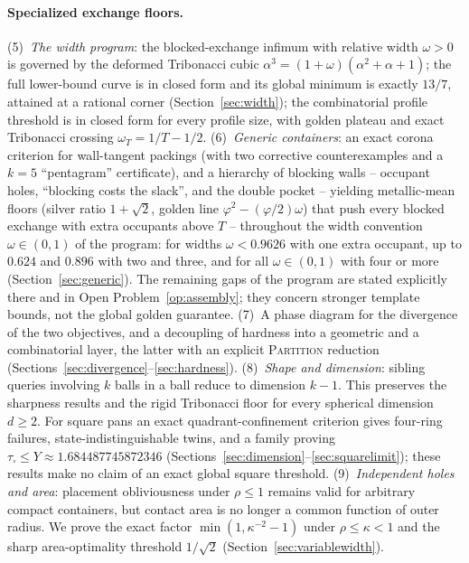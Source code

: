 \documentclass[11pt]{article}
\theoremstyle{definition}
\begin{document}
\paragraph{Specialized exchange floors.}
(5)~\emph{The width program}: the blocked-exchange infimum with relative
width $\omega>0$ is governed by the deformed Tribonacci cubic
$\alpha^3=(1+\omega)(\alpha^2+\alpha+1)$; the full lower-bound curve is in
closed form and its global minimum is exactly $13/7$, attained at a rational
corner (Section~\ref{sec:width}); the combinatorial profile threshold is
in closed form for every profile size, with golden plateau and exact Tribonacci
crossing $\omega_T=1/T-1/2$.
(6)~\emph{Generic containers}: an exact corona criterion for wall-tangent
packings (with two corrective counterexamples and a $k=5$ ``pentagram''
certificate), and a hierarchy of blocking walls -- occupant holes, ``blocking
costs the slack'', and the double pocket -- yielding metallic-mean floors
(silver ratio $1+\sqrt2$, golden line $\varphi^2-(\varphi/2)\omega$) that
push every blocked exchange with extra occupants above $T$ -- throughout
the width convention $\omega\in(0,1)$ of the program: for widths
$\omega<0.9626$ with one extra occupant, up to $0.624$ and $0.896$ with two
and three, and for all $\omega\in(0,1)$ with four or more
(Section~\ref{sec:generic}). The remaining gaps of the program are stated
explicitly there and in Open Problem~\ref{op:assembly}; they concern
stronger template bounds, not the global golden guarantee.
(7)~A phase diagram for the divergence of the two objectives, and a
decoupling of hardness into a geometric and a combinatorial layer, the
latter with an explicit \textsc{Partition} reduction
(Sections~\ref{sec:divergence}--\ref{sec:hardness}).
(8)~\emph{Shape and dimension}: sibling queries involving $k$ balls in
a ball reduce to dimension $k-1$. This preserves the sharpness results
and the rigid Tribonacci floor for every spherical dimension $d\ge2$.
For square pans an exact quadrant-confinement criterion gives four-ring
failures, state-indistinguishable twins, and a family proving
$\tau_{\square}\le Y\approx1.684487745872346$
(Sections~\ref{sec:dimension}--\ref{sec:squarelimit}); these results
make no claim of an exact global square threshold.
(9)~\emph{Independent holes and area}: placement obliviousness under
$\rho\le1$ remains valid for arbitrary compact containers, but contact
area is no longer a common function of outer radius. We prove the exact
factor $\min(1,\kappa^{-2}-1)$ under $\rho\le\kappa<1$ and the sharp
area-optimality threshold $1/\sqrt2$ (Section~\ref{sec:variablewidth}).
\end{document}
